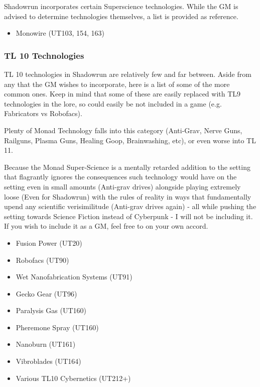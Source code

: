 \begin{multicols*}{3}
	Shadowrun incorporates certain Superscience technologies. While the GM is advised to determine technologies themselves, a list is provided as reference.
	
	\begin{itemize}
		\item Monowire (UT103, 154, 163)
	\end{itemize}
	
	\subsubsection{TL 10 Technologies}
	
	TL 10 technologies in Shadowrun are relatively few and far between. Aside from any that the GM wishes to incorporate, here is a list of some of the more common ones. Keep in mind that some of these are easily replaced with TL9 technologies in the lore, so could easily be not included in a game (e.g. Fabricators vs Robofacs).
	
	Plenty of Monad Technology falls into this category (Anti-Grav, Nerve Guns, Railguns, Plasma Guns, Healing Goop, Brainwashing, etc), or even worse into TL 11.
	
	Because the Monad Super-Science is a mentally retarded addition to the setting that flagrantly ignores the consequences such technology would have on the setting even in small amounts (Anti-grav drives) alongside playing extremely loose (Even for Shadowrun) with the rules of reality in ways that fundamentally upend any scientific verisimilitude (Anti-grav drives again) - all while pushing the setting towards Science Fiction instead of Cyberpunk - I will not be including it. If you wish to include it as a GM, feel free to on your own accord.
	
	\begin{itemize}
		\itemsep 0pt
		\item Fusion Power (UT20)
		\item Robofacs (UT90)
		\item Wet Nanofabrication Systems (UT91)
		\item Gecko Gear (UT96)
		\item Paralysis Gas (UT160)
		\item Pheremone Spray (UT160)
		\item Nanoburn (UT161)
		\item Vibroblades (UT164)
		\item Various TL10 Cybernetics (UT212+)
	\end{itemize}
	

\end{multicols*}
